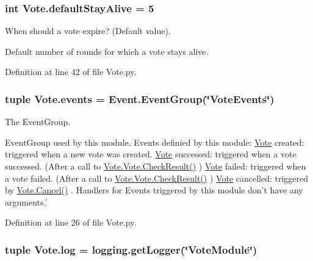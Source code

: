 \hypertarget{namespace_vote_a3ed2d759405d2be1e6f53c128aef371a}{
\subsubsection[{defaultStayAlive}]{\setlength{\rightskip}{0pt plus 5cm}int {\bf Vote.defaultStayAlive} = 5}}
\label{namespace_vote_a3ed2d759405d2be1e6f53c128aef371a}


When should a vote expire? (Default value). 

Default number of rounds for which a vote stays alive. 

Definition at line 42 of file Vote.py.

\hypertarget{namespace_vote_a611c4a69371fcbdcc7683a654b737a14}{
\subsubsection[{events}]{\setlength{\rightskip}{0pt plus 5cm}tuple {\bf Vote.events} = {\bf Event.EventGroup}(\char`\"{}VoteEvents\char`\"{})}}
\label{namespace_vote_a611c4a69371fcbdcc7683a654b737a14}


The EventGroup. 

EventGroup used by this module. Events definied by this module: \hyperlink{namespace_vote}{Vote} created: triggered when a new vote was created. \hyperlink{namespace_vote}{Vote} successed: triggered when a vote successed. (After a call to \hyperlink{class_vote_1_1_vote_acda3525e83e91d9e4622218635f92d4b}{Vote.Vote.CheckResult()} ) \hyperlink{namespace_vote}{Vote} failed: triggered when a vote failed. (After a call to \hyperlink{class_vote_1_1_vote_acda3525e83e91d9e4622218635f92d4b}{Vote.Vote.CheckResult()} ) \hyperlink{namespace_vote}{Vote} cancelled: triggered by \hyperlink{namespace_vote_a5d75127361161b29f9a36a7f8d3cc1ed}{Vote.Cancel()} . Handlers for Events triggered by this module don't have any arguments.' 

Definition at line 26 of file Vote.py.

\hypertarget{namespace_vote_a081b01b11b311cef57a1bd37c864d363}{
\subsubsection[{log}]{\setlength{\rightskip}{0pt plus 5cm}tuple {\bf Vote.log} = logging.getLogger(\char`\"{}VoteModule\char`\"{})}}
\label{namespace_vote_a081b01b11b311cef57a1bd37c864d363}


